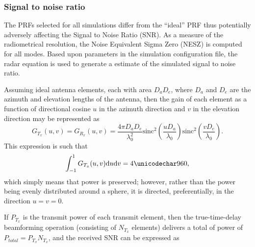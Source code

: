 \subsubsection{Signal to noise ratio}
The PRFs selected for all simulations differ from the ``ideal'' PRF thus potentially adversely affecting the Signal to Noise Ratio (SNR). As a measure of the radiometrical resolution, the Noise Equivalent Sigma Zero (NESZ) is computed for all modes. 
Based upon parameters in the simulation configuration file, the radar equation is used to generate a estimate of the simulated signal to noise ratio. 
\par
Assuming ideal antenna elements, each with area $D_aD_e$, where $D_a$ and $D_e$ are the azimuth and elevation lengths of the antenna, then the gain of each element as a function of directional cosine $u$ in the azimuth direction and $v$ in the elevation direction may be represented as
\begin{equation}
 G_{T_x}(u,v) = G_{R_x}(u,v) = \frac{4\pi D_aD_e}{\lambda_0^2}\text{sinc}^2\left(\frac{uD_a}{\lambda_0}\right)\text{sinc}^2\left(\frac{vD_e}{\lambda_0}\right).
 \label{eq:gainPattern}
\end{equation}
This expression is such that
\begin{equation}
 \int_{-1}^1G_{T_x}(u,v)\d{u}\d{v}=4\pi,
\end{equation}
which simply means that power is preserved; however, rather than the power being evenly distributed around a sphere, it is directed, preferentially, in the direction $u=v=0$.
\par
If $P_{T_x}$ is the transmit power of each transmit element, then the true-time-delay beamforming operation (consisting of $N_{T_x}$ elements) delivers a total of power of $P_{total} = P_{T_x}N_{T_x}$, and the received SNR can be expressed as
